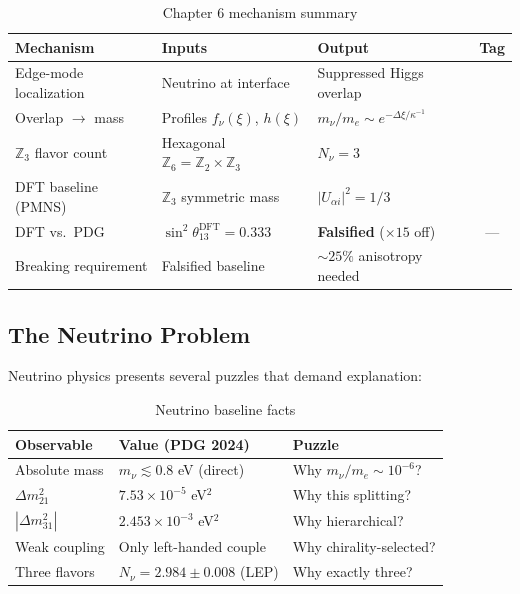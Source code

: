 \begin{table}[ht]
\centering
\caption{Chapter 6 mechanism summary}
\label{tab:ch6_mechanism_summary}
\begin{tabular}{p{3.5cm}p{3.5cm}p{3.5cm}c}
\toprule
\textbf{Mechanism} & \textbf{Inputs} & \textbf{Output} & \textbf{Tag} \\
\midrule
Edge-mode localization & Neutrino at interface \tagP{} &
    Suppressed Higgs overlap & \tagDc{} \\
Overlap $\to$ mass & Profiles $f_\nu(\xi)$, $h(\xi)$ \tagP{} &
    $m_\nu/m_e \sim e^{-\Delta \xi/\kappa^{-1}}$ & \tagDc{} \\
$\mathbb{Z}_3$ flavor count & Hexagonal $\mathbb{Z}_6 = \mathbb{Z}_2 \times \mathbb{Z}_3$ &
    $N_\nu = 3$ & \tagI{} \\
DFT baseline (PMNS) & $\mathbb{Z}_3$ symmetric mass &
    $|U_{\alpha i}|^2 = 1/3$ & \tagDc{} \\
DFT vs.\ PDG & $\sin^2\theta_{13}^{\text{DFT}} = 0.333$ &
    \textbf{Falsified} ($\times 15$ off) & --- \\
Breaking requirement & Falsified baseline &
    $\sim 25\%$ anisotropy needed & \tagP{} \\
\bottomrule
\end{tabular}
\end{table}

\subsection{The Neutrino Problem}
\label{sec:ch6_problem}

Neutrino physics presents several puzzles that demand explanation:

\begin{table}[ht]
\centering
\caption{Neutrino baseline facts \tagBL{}}
\label{tab:ch6_baselines}
\begin{tabular}{lll}
\toprule
\textbf{Observable} & \textbf{Value (PDG 2024)} & \textbf{Puzzle} \\
\midrule
Absolute mass & $m_\nu \lesssim 0.8$ eV (direct) & Why $m_\nu/m_e \sim 10^{-6}$? \\
$\Delta m_{21}^2$ & $7.53 \times 10^{-5}$ eV$^2$ & Why this splitting? \\
$|\Delta m_{31}^2|$ & $2.453 \times 10^{-3}$ eV$^2$ & Why hierarchical? \\
Weak coupling & Only left-handed couple & Why chirality-selected? \\
Three flavors & $N_\nu = 2.984 \pm 0.008$ (LEP) & Why exactly three? \\
\bottomrule
\end{tabular}
\end{table}

